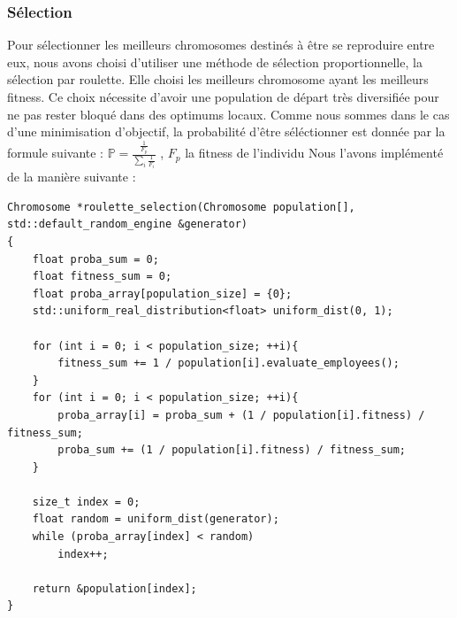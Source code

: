 \documentclass{article}
\begin{document}
        \subsubsection{Sélection}
        Pour sélectionner les meilleurs chromosomes destinés à être se reproduire entre eux, nous avons choisi d'utiliser une méthode de sélection proportionnelle, la sélection par roulette. Elle choisi les meilleurs chromosome ayant les meilleurs fitness. Ce choix nécessite d'avoir une population de départ très diversifiée pour ne pas rester bloqué dans des optimums locaux. Comme nous sommes dans le cas d'une minimisation d'objectif, la probabilité d'être séléctionner est donnée par la formule suivante : 
        \everymath{\displaystyle}
        $\mathbb{P} = \frac{\frac{1}{F_p}}{\sum_{i}^{} \frac{1}{F_i}}$ ,  $F_p$ la fitness de l'individu
        \newline
        Nous l'avons implémenté  de la manière suivante :
\begin{lstlisting}
Chromosome *roulette_selection(Chromosome population[], std::default_random_engine &generator)
{
    float proba_sum = 0;
    float fitness_sum = 0;
    float proba_array[population_size] = {0};
    std::uniform_real_distribution<float> uniform_dist(0, 1);

    for (int i = 0; i < population_size; ++i){
        fitness_sum += 1 / population[i].evaluate_employees();
    }
    for (int i = 0; i < population_size; ++i){
        proba_array[i] = proba_sum + (1 / population[i].fitness) / fitness_sum;
        proba_sum += (1 / population[i].fitness) / fitness_sum;
    }

    size_t index = 0;
    float random = uniform_dist(generator);
    while (proba_array[index] < random)
        index++;

    return &population[index];
}
\end{lstlisting}
\end{document}
